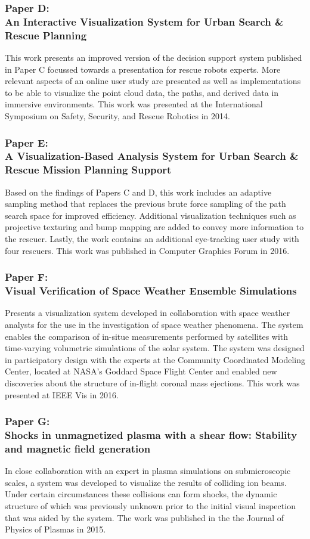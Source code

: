 \subsubsection{Paper D:\\An Interactive Visualization System for Urban Search \& Rescue Planning}
This work presents an improved version of the decision support system published in Paper C focussed towards a presentation for rescue robots experts.  More relevant aspects of an online user study are presented as well as implementations to be able to visualize the point cloud data, the paths, and derived data in immersive environments.  This work was presented at the International Symposium on Safety, Security, and Rescue Robotics in 2014.

\subsubsection{Paper E:\\A Visualization-Based Analysis System for Urban Search \& Rescue Mission Planning Support}
Based on the findings of Papers C and D, this work includes an adaptive sampling method that replaces the previous brute force sampling of the path search space for improved efficiency.  Additional visualization techniques such as projective texturing and bump mapping are added to convey more information to the rescuer.  Lastly, the work contains an additional eye-tracking user study with four rescuers.  This work was published in Computer Graphics Forum in 2016.

\subsubsection{Paper F:\\Visual Verification of Space Weather Ensemble Simulations}
Presents a visualization system developed in collaboration with space weather analysts for the use in the investigation of space weather phenomena.  The system enables the comparison of in-situe measurements performed by satellites with time-varying volumetric simulations of the solar system.  The system was designed in participatory design with the experts at the Community Coordinated Modeling Center, located at NASA's Goddard Space Flight Center and enabled new discoveries about the structure of in-flight coronal mass ejections.  This work was presented at IEEE Vis in 2016.

\subsubsection{Paper G:\\Shocks in unmagnetized plasma with a shear flow: Stability and magnetic field generation}
In close collaboration with an expert in plasma simulations on submicroscopic scales, a system was developed to visualize the results of colliding ion beams.  Under certain circumstances these collisions can form shocks, the dynamic structure of which was previously unknown prior to the initial visual inspection that was aided by the system.  The work was published in the the Journal of Physics of Plasmas in 2015.

